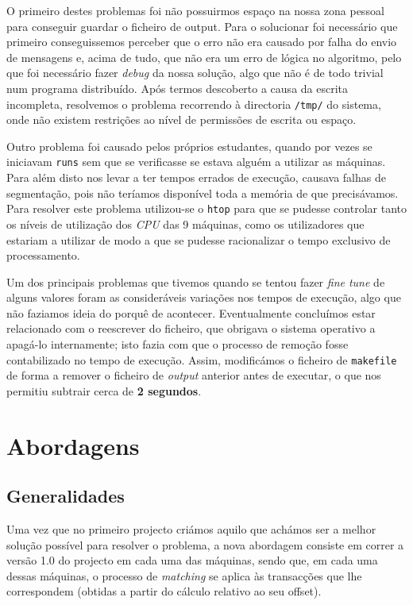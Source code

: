 \documentclass[a4paper]{article}
\begin{document}
O primeiro destes problemas foi não possuirmos espaço na nossa zona pessoal para conseguir guardar o ficheiro de output. Para o solucionar foi necessário que primeiro conseguissemos perceber que o erro não era causado por falha do envio de mensagens e, acima de tudo, que não era um erro de lógica no algoritmo, pelo que foi necessário fazer \textit{debug} da nossa solução, algo que não é de todo trivial num programa distribuído. Após termos descoberto a causa da escrita incompleta, resolvemos o problema recorrendo à directoria \texttt{/tmp/} do sistema, onde não existem restrições ao nível de permissões de escrita ou espaço.

Outro problema foi causado pelos próprios estudantes, quando por vezes se iniciavam \texttt{runs} sem que se verificasse se estava alguém a utilizar as máquinas. Para além disto nos levar a ter tempos errados de execução, causava falhas de segmentação, pois não teríamos disponível toda a memória de que precisávamos. Para resolver este problema utilizou-se o \texttt{htop} para que se pudesse controlar tanto os níveis de utilização dos \textit{CPU} das 9 máquinas, como os utilizadores que estariam a utilizar de modo a que se pudesse racionalizar o tempo exclusivo de processamento.

Um dos principais problemas que tivemos quando se tentou fazer \textit{fine tune} de alguns valores foram as consideráveis variações nos tempos de execução, algo que não faziamos ideia do porquê de acontecer. Eventualmente concluímos estar relacionado com o reescrever do ficheiro, que obrigava o sistema operativo a apagá-lo internamente; isto fazia com que o processo de remoção fosse contabilizado no tempo de execução. Assim, modificámos o ficheiro de \texttt{makefile} de forma a remover o ficheiro de \textit{output} anterior antes de executar, o que nos permitiu subtrair cerca de \textbf{2 segundos}.
\clearpage

\section{Abordagens}
\subsection{Generalidades}
\indent \indent Uma vez que no primeiro projecto criámos aquilo que achámos ser a melhor solução possível para resolver o problema, a nova abordagem consiste em correr a versão 1.0 do projecto em cada uma das máquinas, sendo que, em cada uma dessas máquinas, o processo de \textit{matching} se aplica às transacções que lhe correspondem (obtidas a partir do cálculo relativo ao seu offset).
\end{document}
